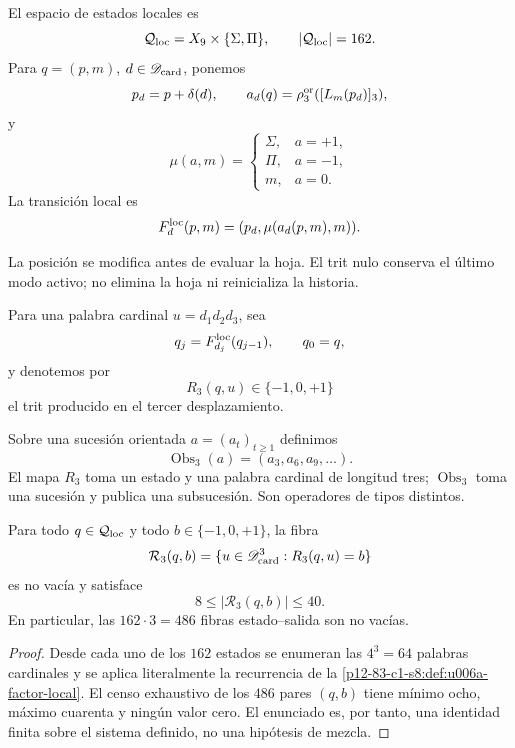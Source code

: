 {\begin{definition}
\label{p12-83-c1-s8:def:u006a-factor-local}
El espacio de estados locales es
\[
 \mathcal Q_{\rm loc}=X_9\times\{\Sigma,\Pi\},
 \qquad |\mathcal Q_{\rm loc}|=162.
\]
Para \(q=(p,m)\), \(d\in\mathscr D_{\rm card}\), ponemos
\[
 p_d=p+\delta(d),
 \qquad
 a_d(q)=\rho_3^{\rm or}([L_m(p_d)]_3),
\]
y
\[
 \mu(a,m)=
 \begin{cases}
  \Sigma,&a=+1,\\
  \Pi,&a=-1,\\
  m,&a=0.
 \end{cases}
\]
La transición local es
\[
 F_d^{\rm loc}(p,m)=(p_d,\mu(a_d(p,m),m)).
\]
\end{definition}

La posición se modifica antes de evaluar la hoja. El trit nulo conserva el
último modo activo; no elimina la hoja ni reinicializa la historia.

Para una palabra cardinal \(u=d_1d_2d_3\), sea
\[
 q_j=F_{d_j}^{\rm loc}(q_{j-1}),\qquad q_0=q,
\]
y denotemos por
\[
 R_3(q,u)\in\{-1,0,+1\}
\]
el trit producido en el tercer desplazamiento.

\begin{definition}
\label{p12-83-c1-s8:def:u006a-obs3}
Sobre una sucesión orientada \(a=(a_t)_{t\geq1}\) definimos
\[
 \operatorname{Obs}_3(a)=(a_3,a_6,a_9,\ldots).
\]
El mapa \(R_3\) toma un estado y una palabra cardinal de longitud tres;
\(\operatorname{Obs}_3\) toma una sucesión y publica una subsucesión. Son
operadores de tipos distintos.
\end{definition}

\begin{theorem}
\label{p12-83-c1-s8:thm:u006a-sobreyectividad-r3}
Para todo \(q\in\mathcal Q_{\rm loc}\) y todo
\(b\in\{-1,0,+1\}\), la fibra
\[
 \mathcal R_3(q,b)
 =\{u\in\mathscr D_{\rm card}^3:R_3(q,u)=b\}
\]
es no vacía y satisface
\[
 \boxed{8\leq |\mathcal R_3(q,b)|\leq40.}
\]
En particular, las \(162\cdot3=486\) fibras estado--salida son no vacías.
\end{theorem}

\begin{proof}
Desde cada uno de los \(162\) estados se enumeran las \(4^3=64\) palabras
cardinales y se aplica literalmente la recurrencia de la
\cref{p12-83-c1-s8:def:u006a-factor-local}. El censo exhaustivo de los \(486\) pares
\((q,b)\) tiene mínimo ocho, máximo cuarenta y ningún valor cero. El
enunciado es, por tanto, una identidad finita sobre el sistema definido, no
una hipótesis de mezcla.
\end{proof}

}
